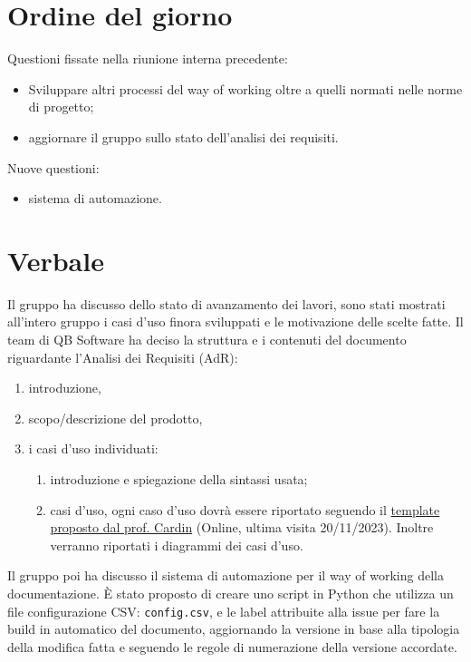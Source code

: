\documentclass[12pt]{article}
\begin{document}
    \section{Ordine del giorno}
    Questioni fissate nella riunione interna precedente:
    \begin{itemize}
    	\item Sviluppare altri processi del way of working oltre a quelli normati nelle norme
    	di progetto;
    	\item aggiornare il gruppo sullo stato dell’analisi dei requisiti.
    \end{itemize}
    
    Nuove questioni:
    \begin{itemize}
    	\item sistema di automazione.
    \end{itemize}
    
    \section{Verbale}
    Il gruppo ha discusso dello stato di avanzamento dei lavori, sono stati mostrati all'intero gruppo i casi d'uso finora sviluppati e le motivazione delle scelte fatte. Il team di QB Software ha deciso la struttura e i contenuti del documento riguardante l'Analisi dei Requisiti (AdR):
    \begin{enumerate}
    	\item introduzione,
    	\item scopo/descrizione del prodotto,
    	\item i casi d'uso individuati:
    	\begin{enumerate}
    		\item introduzione e spiegazione della sintassi usata;
    		\item casi d'uso, ogni caso d'uso dovrà essere riportato seguendo il \href{https://github.com/rcardin/swe-imdb/blob/main/use-cases/template.md}{template proposto dal prof. Cardin} (Online, ultima visita 20/11/2023). Inoltre verranno riportati i diagrammi dei casi d'uso.
    	\end{enumerate}
    \end{enumerate}
    \noindent
    Il gruppo poi ha discusso il sistema di automazione per il way of working della documentazione. È stato proposto di creare uno script in Python che utilizza un file configurazione CSV: \verb|config.csv|, e le label attribuite alla issue per fare la build in automatico del documento, aggiornando la versione in base alla tipologia della modifica fatta e seguendo le regole di numerazione della versione accordate.
     
\end{document}
